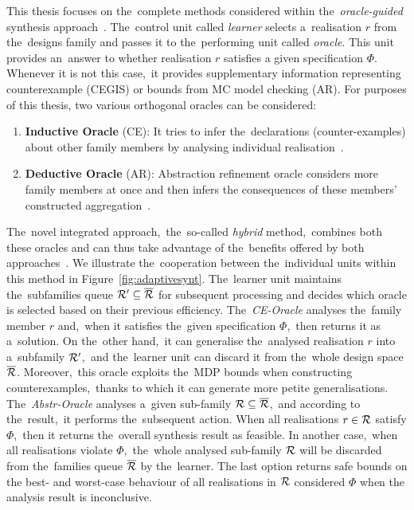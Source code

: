 This thesis focuses on the~complete methods considered within the~\textit{oracle-guided} synthesis approach~\cite{oracle1,oracle2}.
The~control unit called \textit{learner} selects a~realisation $r$ from the~designs family and passes it to the~performing unit called \textit{oracle}.
This unit provides an~answer to whether realisation $r$ satisfies a given specification $\Phi$.
Whenever it is not this case,~it provides supplementary information representing counterexample (CEGIS) or bounds from MC model checking (AR).
For purposes of this thesis, two various orthogonal oracles can be considered:
\begin{enumerate}[label=(\roman*)]
    \item \textbf{Inductive Oracle} (CE): It tries to infer the~declarations (counter-examples) about other family members by analysing individual realisation~\cite{cegis}.
    \item \textbf{Deductive Oracle} (AR): Abstraction refinement oracle considers more family members at once and then infers the consequences of these members' constructed aggregation~\cite{cegar}.
\end{enumerate}
The~novel integrated approach,~the~so-called \textit{hybrid} method,~combines both these oracles and can thus take advantage of the~benefits offered by both approaches~\cite{roman-DP,tacas21}.
We illustrate the~cooperation between the~individual units within this method in Figure~\ref{fig:adaptivesynt}.
The~learner unit maintains the~subfamilies queue $\mathcal{R}' \subseteq \overline{\mathcal{R}}$ for subsequent processing and decides which oracle is selected based on their previous efficiency.
The~\textit{CE-Oracle} analyses the~family member $r$ and,~when it satisfies the~given specification $\Phi$,~then returns it as a~solution.
On the~other hand,~it can generalise the~analysed realisation $r$ into a~subfamily $\mathcal{R}'$,~and the~learner unit can discard it from the~whole design space $\overline{\mathcal{R}}$.
Moreover,~this oracle exploits the~MDP bounds when constructing counterexamples,~thanks to which it can generate more petite generalisations.
The~\textit{Abstr-Oracle} analyses a~given sub-family $\mathcal{R} \subseteq \overline{\mathcal{R}}$,~and according to the~result,~it performs the~subsequent action.
When all realisations $r \in \mathcal{R}$ satisfy $\Phi$,~then it returns the~overall synthesis result as feasible.
In another case,~when all realisations violate $\Phi$,~the~whole analysed sub-family $\mathcal{R}$ will be discarded from the~families queue $\overline{\mathcal{R}}$ by the~learner.
The last option returns safe bounds on the best- and worst-case behaviour of all realisations in $\mathcal{R}$ considered $\Phi$ when the analysis result is inconclusive.

